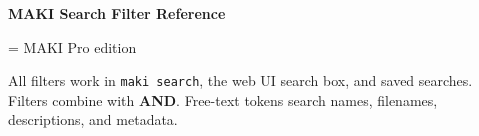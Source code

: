 \documentclass[a4paper,10pt]{extarticle}
\newcommand{\cmd}[1]{\texttt{#1}}
\newcommand{\pro}{\textcolor{maki-teal}{\scriptsize\sffamily [Pro]}}
\begin{document}

\begin{center}
{\Large\bfseries\color{maki-salmon} MAKI Search Filter Reference}
\end{center}
\vspace{2pt}

{\color{maki-stone}\small \pro{} = MAKI Pro edition}

\vspace{4pt}

All filters work in \cmd{maki search}, the web UI search box, and saved searches.
Filters combine with \textbf{AND}. Free-text tokens search names, filenames, descriptions, and metadata.

\vspace{8pt}
\end{document}
